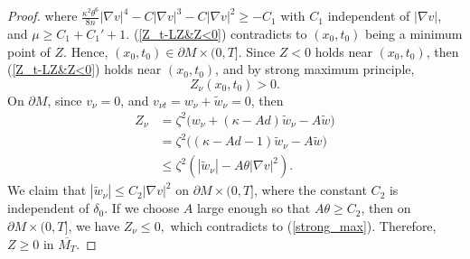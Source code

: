 \documentclass[12pt]{amsart}
\theoremstyle{definition}
\theoremstyle{remark}
\numberwithin{equation}{section}
\begin{document}
\begin{proof}
	where $\frac{\kappa^2 \theta^6}{8n} |\nabla v|^4 - C|\nabla v|^3 - C |\nabla v|^2 \geq - C_1$ with $C_1$ independent of $|\nabla v|$, and $\mu \geq C_1 + C_1' + 1$.
	(\ref{Z_t-LZ&Z<0}) contradicts to $(x_0, t_0)$ being a minimum point of $Z$. Hence, $(x_0, t_0) \in \partial M \times (0, T]$. Since $Z < 0$ holds near $(x_0, t_0)$, then (\ref{Z_t-LZ&Z<0}) holds near $(x_0, t_0)$, and by strong maximum principle,
	\begin{equation}\label{strong_max}
	Z_\nu (x_0, t_0) > 0.
	\end{equation}
	On $\partial M$, since $v_\nu = 0$, and $v_{\nu t} = w_\nu + \tilde{w}_\nu = 0$, then 
	\begin{equation}
	\begin{aligned}
	Z_\nu &= \zeta^2 \big(w_\nu + (\kappa - Ad)\tilde{w}_\nu - A\tilde{w}\big) \\
	&= \zeta^2 \big((\kappa - Ad - 1)\tilde{w}_\nu - A\tilde{w}\big)\\
	&\leq \zeta^2 (|\tilde{w}_\nu| - A\theta |\nabla v|^2).
	\end{aligned}
	\end{equation}
	We claim that $|\tilde{w}_\nu| \leq C_2 |\nabla v|^2$ on $\partial M \times (0, T]$, where the constant $C_2$ is independent of $\delta_0$. If we choose $A$ large enough so that $A\theta \geq C_2$, then on $\partial M \times (0, T]$, we have $Z_\nu \leq 0,$
	which contradicts to (\ref{strong_max}).
	Therefore, $Z \geq 0$ in $\overline{M_T}$.
	

\end{proof}
\end{document}
